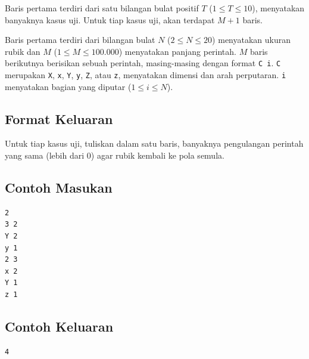 \documentclass{article}
\begin{document}
Baris pertama terdiri dari satu bilangan bulat positif $T$ ($1 \leq T \leq 10$), menyatakan banyaknya kasus uji.
Untuk tiap kasus uji, akan terdapat $M + 1$ baris.

Baris pertama terdiri dari bilangan bulat $N$ ($2 \leq N \leq 20$) menyatakan ukuran rubik dan $M$ ($1 \leq M \leq 100.000$) menyatakan panjang perintah.
$M$ baris berikutnya berisikan sebuah perintah, masing-masing dengan format \lstinline{C i}.
\lstinline{C} merupakan \lstinline{X}, \lstinline{x}, \lstinline{Y}, \lstinline{y}, \lstinline{Z}, atau \lstinline{z}, menyatakan dimensi dan arah perputaran.
\lstinline{i} menyatakan bagian yang diputar ($1 \leq i \leq N$).

\subsection*{Format Keluaran}

Untuk tiap kasus uji, tuliskan dalam satu baris, banyaknya pengulangan perintah yang sama (lebih dari 0) agar rubik kembali ke pola semula.
\\

\begin{multicols}{2}
\subsection*{Contoh Masukan}
\begin{lstlisting}
2
3 2
Y 2
y 1
2 3
x 2
Y 1
z 1
\end{lstlisting}
\columnbreak
\subsection*{Contoh Keluaran}
\begin{lstlisting}
4
\end{lstlisting}
\vfill
\null
\end{multicols}
\end{document}

